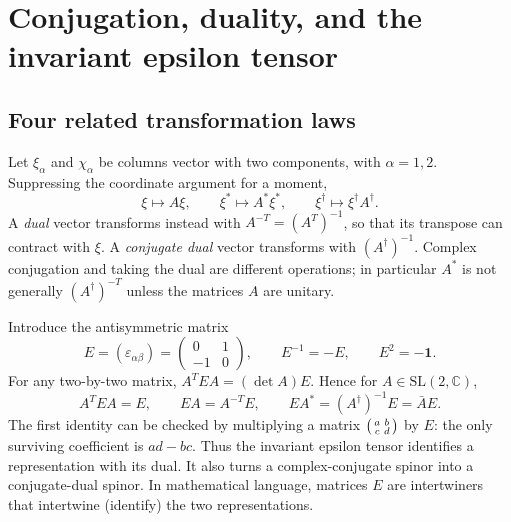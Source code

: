 \documentclass[11pt]{article}
\newcommand{\C}{\mathbb C}
\newcommand{\SL}{\mathrm{SL}}
\newcommand{\eps}{\varepsilon}
\newcommand{\one}{\mathbf 1}
\begin{document}
\section{Conjugation, duality, and the invariant epsilon tensor}
\subsection{Four related transformation laws}
Let \(\xi_\alpha\) and \(\chi_\alpha\) be columns vector with two components, with
\(\alpha=1,2\). Suppressing the coordinate argument for a moment,
\begin{equation}
 \xi\mapsto A\xi,\qquad
 \xi^*\mapsto A^*\xi^*,\qquad
 \xi^\dagger\mapsto\xi^\dagger A^\dagger.
 \label{eq:conjugates}
\end{equation}
A {\it dual} vector transforms instead with \(A^{-T}=(A^T)^{-1}\), so that its
transpose can contract with \(\xi\). A {\it conjugate dual} vector 
transforms with \((A^\dagger)^{-1}\). Complex conjugation and taking
the dual are different operations; in particular \(A^*\) is not
generally \((A^\dagger)^{-T}\) unless the matrices $A$ are unitary.

Introduce the antisymmetric matrix
\begin{equation}
 E=(\eps_{\alpha\beta})=
 \begin{pmatrix}0&1\\-1&0\end{pmatrix},\qquad
 E^{-1}=-E,\qquad E^2=-\one.
 \label{eq:E}
\end{equation}
For any two-by-two matrix,
\(A^T E A=(\det A)E\). Hence for \(A\in\SL(2,\C)\),
\begin{equation}
 A^T E A=E,\qquad E A=A^{-T}E,\qquad
 E A^*=(A^\dagger)^{-1}E=\bar{A}E.
 \label{eq:intertwiner}
\end{equation}
The first identity can be checked by multiplying a matrix
\(\begin{psmallmatrix}a&b\\c&d\end{psmallmatrix}\) by \(E\):
the only surviving coefficient is \(ad-bc\). Thus the invariant
epsilon tensor identifies a representation with its dual.
It also turns a complex-conjugate spinor into a conjugate-dual spinor. In mathematical language, matrices $E$ are intertwiners that intertwine (identify) the two representations.
\end{document}
